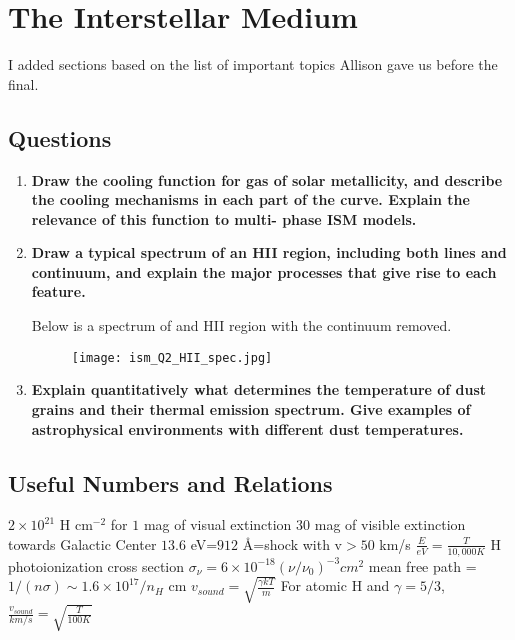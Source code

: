 \section{The Interstellar Medium}

I added sections based on the list of important topics Allison gave us 
before the final. 

\subsection{Questions}
\begin{enumerate}
\item \textbf{Draw the cooling function for gas of solar metallicity, and describe the cooling
      mechanisms in each part of the curve. Explain the relevance of this function to multi-
      phase ISM models.}
\item \textbf{Draw a typical spectrum of an HII region, including both lines and continuum, and
      explain the major processes that give rise to each feature.}
      
      Below is a spectrum of and HII region with the continuum removed.
      
      \begin{figure}[!h]
      \begin{center}
      \texttt{[image: ism\_Q2\_HII\_spec.jpg]}
      \end{center}
	\end{figure}
\item \textbf{Explain quantitatively what determines the temperature of dust grains and their
      thermal emission spectrum. Give examples of astrophysical environments with different
      dust temperatures.}
\end{enumerate}

\subsection{Useful Numbers and Relations}
$2\times10^{21}$ H cm$^{-2}$ for $1$ mag of visual extinction\newline
\newline
$30$ mag of visible extinction towards Galactic Center\newline
\newline
$13.6$ eV=$912$ \AA=shock with v$>50$ km/s\newline
\newline
$\frac{E}{eV}=\frac{T}{10,000 K}$\newline
\newline
H photoionization cross section $\sigma_{\nu}=6\times10^{-18}(\nu/\nu_0)^{-3}
cm^2$\newline
\newline
mean free path = $1/(n\sigma)\sim 1.6\times10^{17}/n_H$ cm\newline
\newline
$v_{sound}=\sqrt{\frac{\gamma kT}{m}}$\newline
\newline
For atomic H and $\gamma=5/3$,\newline
\newline
$\frac{v_{sound}}{km/s}=\sqrt{\frac{T}{100 K}}$

